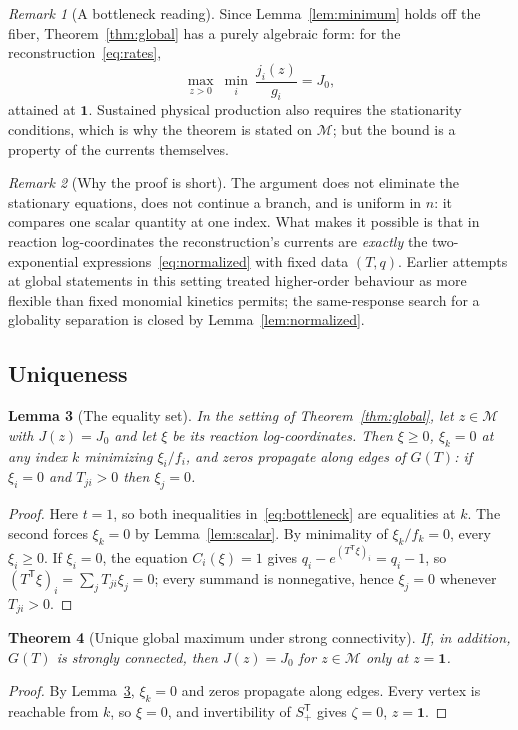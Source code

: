 \documentclass[11pt,a4paper]{article}
\theoremstyle{plain}
\newtheorem{theorem}{Theorem}[section]
\newtheorem{lemma}[theorem]{Lemma}
\theoremstyle{definition}
\theoremstyle{remark}
\newtheorem{remark}[theorem]{Remark}
\numberwithin{equation}{section}
\newcommand{\T}{\mathsf{T}}
\newcommand{\Sp}{S_{+}}
\newcommand{\one}{\mathbf{1}}
\newcommand{\fiber}{\mathcal{M}}
\begin{document}
\begin{remark}[A bottleneck reading]\label{rem:bottleneck}
Since Lemma~\ref{lem:minimum} holds off the fiber, Theorem~\ref{thm:global} has a purely algebraic form: for the reconstruction~\eqref{eq:rates},
\[
 \max_{z>0}\ \min_i\ \frac{j_i(z)}{g_i}=J_0,
\]
attained at $\one$. Sustained physical production also requires the stationarity conditions, which is why the theorem is stated on $\fiber$; but the bound is a property of the currents themselves.
\end{remark}

\begin{remark}[Why the proof is short]
The argument does not eliminate the stationary equations, does not continue a branch, and is uniform in $n$: it compares one scalar quantity at one index. What makes it possible is that in reaction log-coordinates the reconstruction's currents are \emph{exactly} the two-exponential expressions~\eqref{eq:normalized} with fixed data $(T,q)$. Earlier attempts at global statements in this setting treated higher-order behaviour as more flexible than fixed monomial kinetics permits; the same-response search for a globality separation is closed by Lemma~\ref{lem:normalized}.
\end{remark}

\subsection{Uniqueness}

\begin{lemma}[The equality set]\label{lem:equality}
In the setting of Theorem~\ref{thm:global}, let $z\in\fiber$ with $J(z)=J_0$ and let $\xi$ be its reaction log-coordinates. Then $\xi\ge0$, $\xi_k=0$ at any index $k$ minimizing $\xi_i/f_i$, and zeros propagate along edges of $G(T)$: if $\xi_i=0$ and $T_{ji}>0$ then $\xi_j=0$.
\end{lemma}
\begin{proof}
Here $t=1$, so both inequalities in~\eqref{eq:bottleneck} are equalities at $k$. The second forces $\xi_k=0$ by Lemma~\ref{lem:scalar}. By minimality of $\xi_k/f_k=0$, every $\xi_i\ge0$. If $\xi_i=0$, the equation $C_i(\xi)=1$ gives $q_i-e^{(T^{\T}\xi)_i}=q_i-1$, so $(T^{\T}\xi)_i=\sum_jT_{ji}\xi_j=0$; every summand is nonnegative, hence $\xi_j=0$ whenever $T_{ji}>0$.
\end{proof}

\begin{theorem}[Unique global maximum under strong connectivity]\label{thm:unique}
If, in addition, $G(T)$ is strongly connected, then $J(z)=J_0$ for $z\in\fiber$ only at $z=\one$.
\end{theorem}
\begin{proof}
By Lemma~\ref{lem:equality}, $\xi_k=0$ and zeros propagate along edges. Every vertex is reachable from $k$, so $\xi=0$, and invertibility of $\Sp^{\T}$ gives $\zeta=0$, $z=\one$.
\end{proof}
\end{document}
